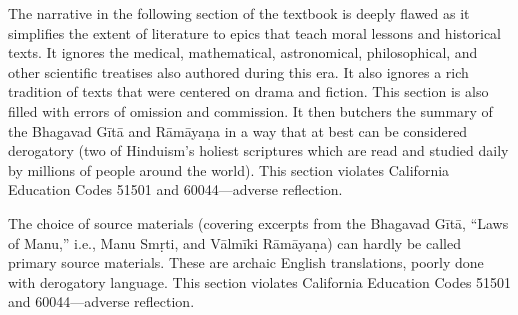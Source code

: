 The narrative in the following section of the textbook is deeply flawed as it simplifies the extent of literature to epics that teach moral lessons and historical texts. It ignores the medical, mathematical, astronomical, philosophical, and other scientific treatises also authored during this era. It also ignores a rich tradition of texts that were centered on drama and fiction. This section is also filled with errors of omission and commission. It then butchers the summary of the Bhagavad Gītā and Rāmāyaṇa in a way that at best can be considered derogatory (two of Hinduism’s holiest scriptures which are read and studied daily by millions of people around the world). This section violates California Education Codes 51501 and 60044—adverse reflection.

The choice of source materials (covering excerpts from the Bhagavad Gītā, “Laws of Manu,” i.e., Manu Smṛti, and Vālmīki Rāmāyaṇa) can hardly be called primary source materials. These are archaic English translations, poorly done with derogatory language. This section violates California Education Codes 51501 and 60044—adverse reflection.

